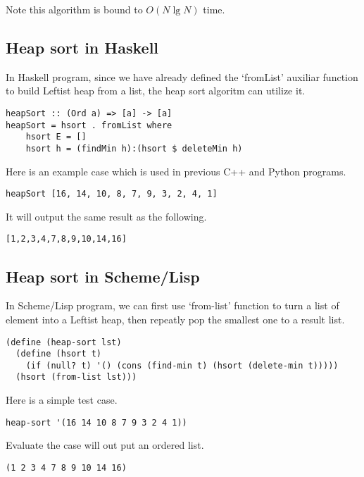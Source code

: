 \documentclass{article}
\begin{document}
Note this algorithm is bound to $O(N \lg N)$ time.

\subsection*{Heap sort in Haskell}

In Haskell program, since we have already defined the `fromList'
auxiliar function to build Leftist heap from a list, the heap sort
algoritm can utilize it.

\lstset{language=Haskell}
\begin{lstlisting}
heapSort :: (Ord a) => [a] -> [a]
heapSort = hsort . fromList where
    hsort E = []
    hsort h = (findMin h):(hsort $ deleteMin h)
\end{lstlisting} %

Here is an example case which is used in previous C++ and Python
programs.

\begin{lstlisting}
heapSort [16, 14, 10, 8, 7, 9, 3, 2, 4, 1]
\end{lstlisting}

It will output the same result as the following.

\begin{verbatim}
[1,2,3,4,7,8,9,10,14,16]
\end{verbatim}

\subsection*{Heap sort in Scheme/Lisp}

In Scheme/Lisp program, we can first use `from-list' function
to turn a list of element into a Leftist heap, then repeatly
pop the smallest one to a result list.

\lstset{language=lisp}
\begin{lstlisting}
(define (heap-sort lst)
  (define (hsort t)
    (if (null? t) '() (cons (find-min t) (hsort (delete-min t)))))
  (hsort (from-list lst)))
\end{lstlisting}

Here is a simple test case.

\begin{lstlisting}
heap-sort '(16 14 10 8 7 9 3 2 4 1))
\end{lstlisting}

Evaluate the case will out put an ordered list.

\begin{lstlisting}
(1 2 3 4 7 8 9 10 14 16)
\end{lstlisting}
\end{document}
